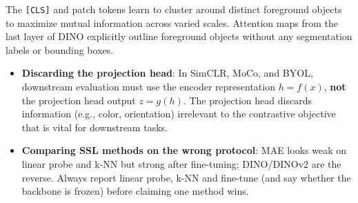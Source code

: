 \begin{qa}
{The \texttt{[CLS]} and patch tokens learn to cluster around distinct foreground objects to maximize mutual information across varied scales.
Attention maps from the last layer of DINO explicitly outline foreground objects without any segmentation labels or bounding boxes.}
\end{qa}

\begin{trap}
\begin{itemize}
\item \textbf{Discarding the projection head}: In SimCLR, MoCo, and BYOL, downstream evaluation must use the encoder representation $h = f(x)$, \textbf{not} the projection head output $z = g(h)$. The projection head discards information (e.g., color, orientation) irrelevant to the contrastive objective that is vital for downstream tasks.
\item \textbf{Comparing SSL methods on the wrong protocol}: MAE looks weak on linear probe and k-NN but strong after fine-tuning; DINO/DINOv2 are the reverse. Always report linear probe, k-NN and fine-tune (and say whether the backbone is frozen) before claiming one method wins.
\end{itemize}
\end{trap}
